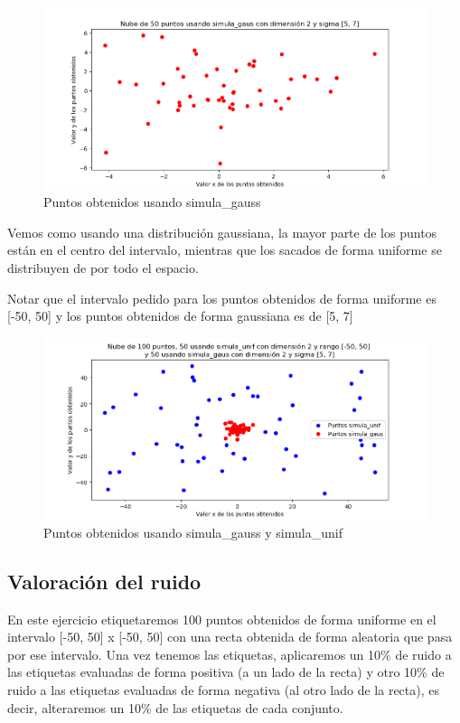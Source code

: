 \documentclass[12pt, spanish]{article}
\begin{document}
\begin{figure}[H]
  \centering
      \includegraphics[scale = 0.70]{ej1-simula_gauss.png}
 		 \caption{Puntos obtenidos usando simula\_gauss}
  		\label{fig:ej1-2}

\end{figure}

Vemos como usando una distribución gaussiana, la mayor parte de los puntos están en el centro del intervalo, mientras que los sacados de forma uniforme se distribuyen de por todo el espacio.

Notar que el intervalo pedido para los puntos obtenidos de forma uniforme es [-50, 50] y los puntos obtenidos de forma gaussiana es de [5, 7]

\begin{figure}[H]
  \centering
      \includegraphics[scale = 0.70]{ej1_fin.png}
 		 \caption{Puntos obtenidos usando simula\_gauss y simula\_unif}
  		\label{fig:ej1-3}

\end{figure}


\subsection{Valoración del ruido}

En este ejercicio etiquetaremos 100 puntos obtenidos de forma uniforme en el intervalo [-50, 50] x [-50, 50] con una recta obtenida de forma aleatoria que pasa por ese intervalo. Una vez tenemos las etiquetas, aplicaremos un 10\% de ruido a las etiquetas evaluadas de forma positiva (a un lado de la recta) y otro 10\% de ruido a las etiquetas evaluadas de forma negativa (al otro lado de la recta), es decir, alteraremos un 10\% de las etiquetas de cada conjunto.
\end{document}
